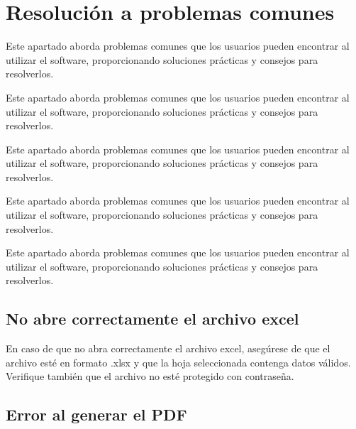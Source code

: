 \documentclass{Pretexto/bluereport}
\begin{document}
\section{Resolución a problemas comunes}
\begin{definicion}
    Este apartado aborda problemas comunes que los usuarios pueden encontrar al utilizar el software, 
    proporcionando soluciones prácticas y consejos para resolverlos.
\end{definicion}
\vspace{0.7cm}
\begin{definicion}
    Este apartado aborda problemas comunes que los usuarios pueden encontrar al utilizar el software, 
    proporcionando soluciones prácticas y consejos para resolverlos.
\end{definicion}
\vspace{0.7cm}
\begin{definicion}
    Este apartado aborda problemas comunes que los usuarios pueden encontrar al utilizar el software, 
    proporcionando soluciones prácticas y consejos para resolverlos.
\end{definicion}
\vspace{0.7cm}
\begin{definicion}
    Este apartado aborda problemas comunes que los usuarios pueden encontrar al utilizar el software, 
    proporcionando soluciones prácticas y consejos para resolverlos.
\end{definicion}
\vspace{0.7cm}
\begin{definicion}
    Este apartado aborda problemas comunes que los usuarios pueden encontrar al utilizar el software, 
    proporcionando soluciones prácticas y consejos para resolverlos.
\end{definicion}


\subsection{No abre correctamente el archivo excel}

En caso de que no abra correctamente el archivo excel, asegúrese de que el archivo esté en formato .xlsx y que la hoja seleccionada contenga datos válidos. Verifique también que el archivo no esté protegido con contraseña.

\subsection{Error al generar el PDF}
\end{document}
